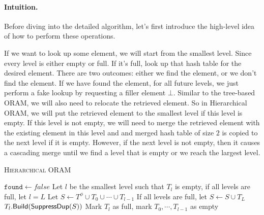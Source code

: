 \paragraph{Intuition.}
Before diving into the detailed algorithm, let's first introduce the high-level idea of how to perform these operations.

If we want to look up some element, we will start from the smallest level.
Since every level is either empty or full. If it's full, 
look up that hash table for the desired element.
There are two outcomes: either we find the element, or we don't find the element.
If we have found the element, for all future levels, we just 
perform a fake lookup by requesting a filler element $\bot$.
Similar to the tree-based ORAM, 
we will also need to relocate the retrieved element.
So in Hierarchical ORAM, we will put the retrieved element 
to the smallest level if this level is empty.
If this level is not empty, we will need to merge the retrieved element with the existing element in this level and 
and merged hash table of size $2$ is copied to the next level
if it is empty. 
However, if the next level is not empty, then 
it causes a cascading merge until we find a level that is empty
or we reach the largest level.  

\begin{algorithm}[t]
  \caption{\textsc{Hierarchical ORAM}}
  \label{alg:oram}
 
 $\texttt{found} \leftarrow false$\;
 Let $l$ be the smallest level such that $T_l$ is empty, if all levels are full, let $l = L$\;
 Let $S \leftarrow T^\phi \cup T_0 \cup \cdots \cup T_{l-1}$\;
 If all levels are full, let $S \leftarrow S \cup T_L$\;
 $T_l.{\sf Build}({\sf SuppressDup}(S))$\;
 Mark $T_l$ as full, mark $T_0, \cdots, T_{l-1}$ as empty\;
 \end{algorithm}



